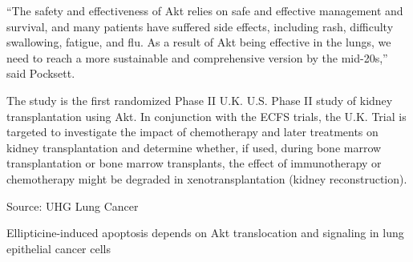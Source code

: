 \documentclass{article}
\begin{document}
“The safety and effectiveness of Akt relies on safe and effective management and survival, and many patients have suffered side effects, including rash, difficulty swallowing, fatigue, and flu. As a result of Akt being effective in the lungs, we need to reach a more sustainable and comprehensive version by the mid-20s,” said Pocksett.

The study is the first randomized Phase II U.K. U.S. Phase II study of kidney transplantation using Akt. In conjunction with the ECFS trials, the U.K. Trial is targeted to investigate the impact of chemotherapy and later treatments on kidney transplantation and determine whether, if used, during bone marrow transplantation or bone marrow transplants, the effect of immunotherapy or chemotherapy might be degraded in xenotransplantation (kidney reconstruction).

Source: UHG Lung Cancer

Ellipticine-induced apoptosis depends on Akt translocation and signaling in lung epithelial cancer cells
\end{document}

